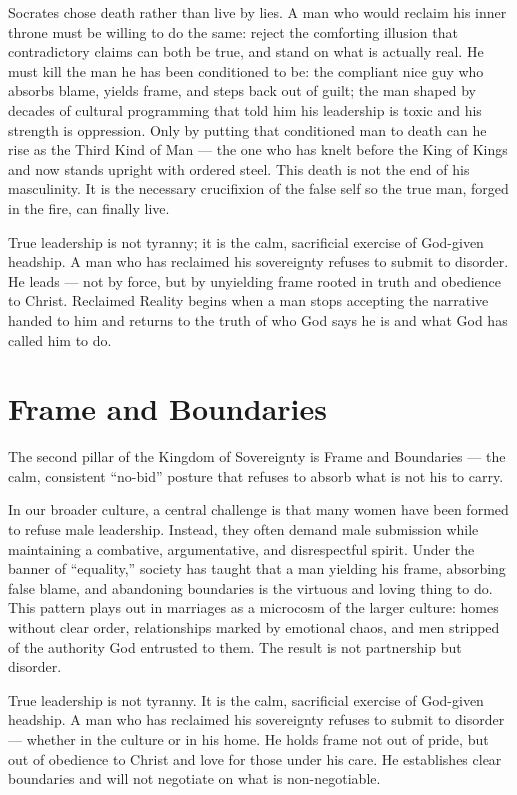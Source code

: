 \documentclass[12pt,a4paper]{book}
\begin{document}
Socrates chose death rather than live by lies. A man who would reclaim his inner throne must be willing to do the same: reject the comforting illusion that contradictory claims can both be true, and stand on what is actually real. He must kill the man he has been conditioned to be: the compliant nice guy who absorbs blame, yields frame, and steps back out of guilt; the man shaped by decades of cultural programming that told him his leadership is toxic and his strength is oppression. Only by putting that conditioned man to death can he rise as the Third Kind of Man — the one who has knelt before the King of Kings and now stands upright with ordered steel. This death is not the end of his masculinity. It is the necessary crucifixion of the false self so the true man, forged in the fire, can finally live.

True leadership is not tyranny; it is the calm, sacrificial exercise of God-given headship. A man who has reclaimed his sovereignty refuses to submit to disorder. He leads — not by force, but by unyielding frame rooted in truth and obedience to Christ. Reclaimed Reality begins when a man stops accepting the narrative handed to him and returns to the truth of who God says he is and what God has called him to do.

\section{Frame and Boundaries}
The second pillar of the Kingdom of Sovereignty is Frame and Boundaries — the calm, consistent “no-bid” posture that refuses to absorb what is not his to carry.

In our broader culture, a central challenge is that many women have been formed to refuse male leadership. Instead, they often demand male submission while maintaining a combative, argumentative, and disrespectful spirit. Under the banner of “equality,” society has taught that a man yielding his frame, absorbing false blame, and abandoning boundaries is the virtuous and loving thing to do. This pattern plays out in marriages as a microcosm of the larger culture: homes without clear order, relationships marked by emotional chaos, and men stripped of the authority God entrusted to them. The result is not partnership but disorder.

True leadership is not tyranny. It is the calm, sacrificial exercise of God-given headship. A man who has reclaimed his sovereignty refuses to submit to disorder — whether in the culture or in his home. He holds frame not out of pride, but out of obedience to Christ and love for those under his care. He establishes clear boundaries and will not negotiate on what is non-negotiable.
\end{document}
